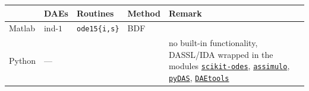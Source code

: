 \documentclass[]{book}
\theoremstyle{definition}
\theoremstyle{definition}
\theoremstyle{definition}
\theoremstyle{definition}
\theoremstyle{remark}
\begin{document}
\begin{longtable}[]{@{}lllll@{}}
\toprule
\begin{minipage}[b]{0.05\columnwidth}\raggedright
\strut
\end{minipage} & \begin{minipage}[b]{0.05\columnwidth}\raggedright
DAEs\strut
\end{minipage} & \begin{minipage}[b]{0.30\columnwidth}\raggedright
Routines\strut
\end{minipage} & \begin{minipage}[b]{0.05\columnwidth}\raggedright
Method\strut
\end{minipage} & \begin{minipage}[b]{0.40\columnwidth}\raggedright
Remark\strut
\end{minipage}\tabularnewline
\midrule
\endhead
\begin{minipage}[t]{0.05\columnwidth}\raggedright
Matlab\strut
\end{minipage} & \begin{minipage}[t]{0.05\columnwidth}\raggedright
ind-\(1\)\strut
\end{minipage} & \begin{minipage}[t]{0.30\columnwidth}\raggedright
\texttt{ode15\{i,s\}}\strut
\end{minipage} & \begin{minipage}[t]{0.05\columnwidth}\raggedright
BDF\strut
\end{minipage} & \begin{minipage}[t]{0.40\columnwidth}\raggedright
\strut
\end{minipage}\tabularnewline
\begin{minipage}[t]{0.05\columnwidth}\raggedright
Python\strut
\end{minipage} & \begin{minipage}[t]{0.05\columnwidth}\raggedright
---\strut
\end{minipage} & \begin{minipage}[t]{0.30\columnwidth}\raggedright
\strut
\end{minipage} & \begin{minipage}[t]{0.05\columnwidth}\raggedright
\strut
\end{minipage} & \begin{minipage}[t]{0.40\columnwidth}\raggedright
no built-in functionality, DASSL/IDA wrapped in the modules \href{https://github.com/bmcage/odes/tree/master}{\texttt{scikit-odes}}, \href{https://jmodelica.org/assimulo/index.html\#}{\texttt{assimulo}}, \href{https://github.com/jwallen/PyDAS}{\texttt{pyDAS}}, \href{http://daetools.com/docs/index.html}{\texttt{DAEtools}}\strut

\end{minipage}
\end{longtable}
\end{document}
